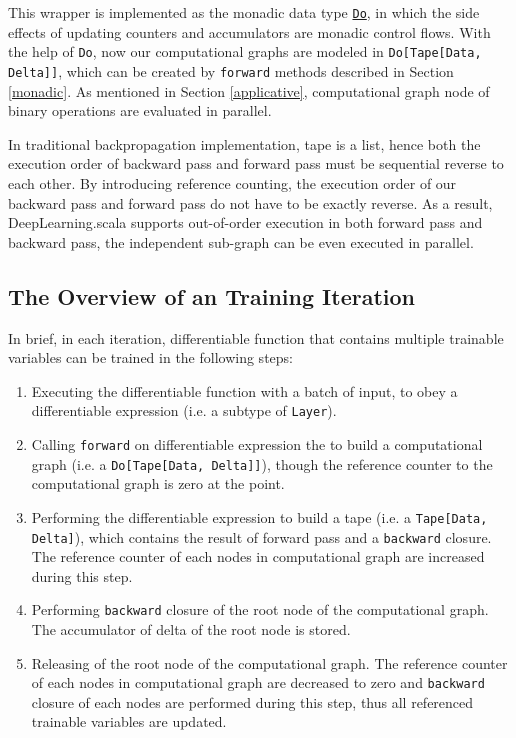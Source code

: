 This wrapper is implemented as the monadic data type \href{https://javadoc.io/page/com.thoughtworks.raii/asynchronous_2.11/latest/com/thoughtworks/raii/asynchronous%24%24Do.html}{\lstinline{Do}}, in which the side effects of updating counters and accumulators are monadic control flows. With the help of \lstinline{Do}, now our computational graphs are modeled in \lstinline{Do[Tape[Data, Delta]]}, which can be created by \lstinline{forward} methods described in Section \ref{monadic}. As mentioned in Section \ref{applicative}, \gls{computational graph} node of binary operations are evaluated in parallel.

In traditional backpropagation implementation, tape is a list, hence both the execution order of backward pass and forward pass must be sequential reverse to each other. By introducing reference counting, the execution order of our backward pass and forward pass do not have to be exactly reverse. As a result, DeepLearning.scala supports out-of-order execution in both forward pass and backward pass, the independent sub-graph can be even executed in parallel.

\subsection{The Overview of an Training Iteration}

In brief, in each iteration, \gls{differentiable function} that contains multiple \glspl{trainable variable} can be trained in the following steps:

\begin{enumerate}
  \item Executing the \gls{differentiable function} with a batch of input, to obey a \gls{differentiable expression} (i.e. a subtype of \lstinline{Layer}).
  \label{obey}
  
  \item Calling \lstinline{forward} on \gls{differentiable expression} the to build a \gls{computational graph} (i.e. a \lstinline{Do[Tape[Data, Delta]]}), though the reference counter to the \gls{computational graph} is zero at the point.
  \label{build}
  
  \item Performing the \gls{differentiable expression} to build a tape (i.e. a \lstinline{Tape[Data, Delta]}), which contains the result of forward pass and a \lstinline{backward} closure. The reference counter of each nodes in \gls{computational graph} are increased during this step.
  \label{acquire}

  \item Performing \lstinline{backward} closure of the root node of the \gls{computational graph}. The accumulator of delta of the root node is stored.

  \item Releasing of the root node of the \gls{computational graph}. The reference counter of each nodes in \gls{computational graph} are decreased to zero and \lstinline{backward} closure of each nodes are performed during this step, thus all referenced \glspl{trainable variable} are updated.
  \label{release}

\end{enumerate}

